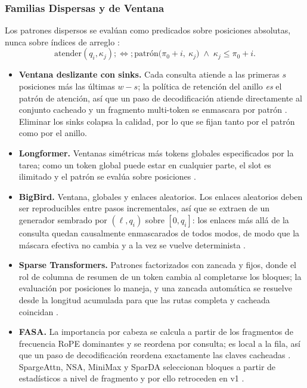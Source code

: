 \subsubsection{Familias Dispersas y de Ventana}

Los patrones dispersos se evalúan como predicados sobre posiciones absolutas, nunca sobre índices de arreglo \citep{child_sparse_transformer_2019}:
\[
\text{atender}(q_i,\kappa_j) ;\Longleftrightarrow; \text{patrón}\big(\pi_0+i,\ \kappa_j\big) \;\wedge\; \kappa_j \le \pi_0+i .
\]

\begin{itemize}[leftmargin=*]
    \item \textbf{Ventana deslizante con sinks.} Cada consulta atiende a las primeras $s$ posiciones más las últimas $w-s$; la política de retención del anillo \emph{es} el patrón de atención, así que un paso de decodificación atiende directamente al conjunto cacheado y un fragmento multi-token se enmascara por patrón \citep{jolicoeur_sliding_window_2026,xiao_streaming_sinks_2024}. Eliminar los sinks colapsa la calidad, por lo que se fijan tanto por el patrón como por el anillo.
    \item \textbf{Longformer.} Ventanas simétricas más tokens globales especificados por la tarea; como un token global puede estar en cualquier parte, el slot es ilimitado y el patrón se evalúa sobre posiciones \citep{beltagy_longformer_2020}.
    \item \textbf{BigBird.} Ventana, globales y enlaces aleatorios. Los enlaces aleatorios deben ser reproducibles entre pasos incrementales, así que se extraen de un generador sembrado por $(\ell, q_i)$ sobre $[0, q_i]$: los enlaces más allá de la consulta quedan causalmente enmascarados de todos modos, de modo que la máscara efectiva no cambia y a la vez se vuelve determinista \citep{zaheer_bigbird_2020}.
    \item \textbf{Sparse Transformers.} Patrones factorizados con zancada y fijos, donde el rol de columna de resumen de un token cambia al completarse los bloques; la evaluación por posiciones lo maneja, y una zancada automática se resuelve desde la longitud acumulada para que las rutas completa y cacheada coincidan \citep{child_sparse_transformer_2019}.
    \item \textbf{FASA.} La importancia por cabeza se calcula a partir de los fragmentos de frecuencia RoPE dominantes y se reordena por consulta; es local a la fila, así que un paso de decodificación reordena exactamente las claves cacheadas \citep{wang_fasa_2026}. SpargeAttn, NSA, MiniMax y SparDA seleccionan bloques a partir de estadísticos a nivel de fragmento y por ello retroceden en v1 \citep{zhang_spargeattn_2025,yuan_nsa_2025,lai_minimax_2026,fu_sparda_2026}.
\end{itemize}

